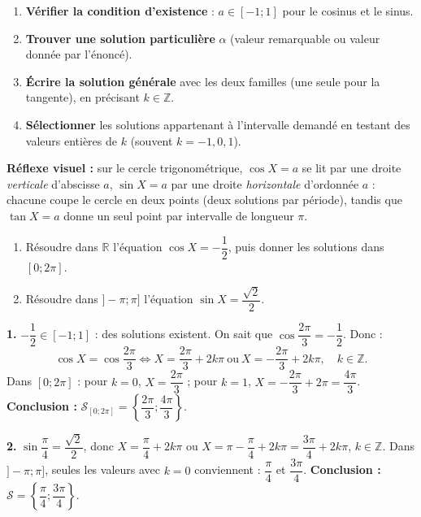 \documentclass[11pt]{article}
\begin{document}
\begin{methode}
\begin{enumerate}
\item \textbf{Vérifier la condition d'existence} : $a\in[-1;1]$ pour le cosinus et le sinus.
\item \textbf{Trouver une solution particulière} $\alpha$ (valeur remarquable ou valeur donnée par l'énoncé).
\item \textbf{Écrire la solution générale} avec les deux familles (une seule pour la tangente), en précisant $k\in\mathbb{Z}$.
\item \textbf{Sélectionner} les solutions appartenant à l'intervalle demandé en testant des valeurs entières de $k$ (souvent $k=-1,0,1$).
\end{enumerate}
\textbf{Réflexe visuel :} sur le cercle trigonométrique, $\cos X=a$ se lit par une droite \emph{verticale} d'abscisse $a$, $\sin X=a$ par une droite \emph{horizontale} d'ordonnée $a$ : chacune coupe le cercle en deux points (deux solutions par période), tandis que $\tan X=a$ donne un seul point par intervalle de longueur $\pi$.
\end{methode}

\begin{exoresolu}[Résoudre $\cos X=-\dfrac{1}{2}$ puis $\sin X=\dfrac{\sqrt{2}}{2}$]
\begin{enumerate}
\item Résoudre dans $\mathbb{R}$ l'équation $\cos X=-\dfrac{1}{2}$, puis donner les solutions dans $[0;2\pi]$.
\item Résoudre dans $]-\pi;\pi]$ l'équation $\sin X=\dfrac{\sqrt{2}}{2}$.
\end{enumerate}
\tcblower
\textbf{1.} $-\dfrac{1}{2}\in[-1;1]$ : des solutions existent. On sait que $\cos\dfrac{2\pi}{3}=-\dfrac{1}{2}$. Donc :
\[ \cos X=\cos\dfrac{2\pi}{3}\iff X=\dfrac{2\pi}{3}+2k\pi \ \text{ou}\ X=-\dfrac{2\pi}{3}+2k\pi,\quad k\in\mathbb{Z}. \]
Dans $[0;2\pi]$ : pour $k=0$, $X=\dfrac{2\pi}{3}$ ; pour $k=1$, $X=-\dfrac{2\pi}{3}+2\pi=\dfrac{4\pi}{3}$.
\textbf{Conclusion :} $\mathcal{S}_{[0;2\pi]}=\left\{\dfrac{2\pi}{3};\dfrac{4\pi}{3}\right\}$.

\textbf{2.} $\sin\dfrac{\pi}{4}=\dfrac{\sqrt{2}}{2}$, donc $X=\dfrac{\pi}{4}+2k\pi$ ou $X=\pi-\dfrac{\pi}{4}+2k\pi=\dfrac{3\pi}{4}+2k\pi$, $k\in\mathbb{Z}$.
Dans $]-\pi;\pi]$, seules les valeurs avec $k=0$ conviennent : $\dfrac{\pi}{4}$ et $\dfrac{3\pi}{4}$.
\textbf{Conclusion :} $\mathcal{S}=\left\{\dfrac{\pi}{4};\dfrac{3\pi}{4}\right\}$.
\end{exoresolu}
\end{document}

